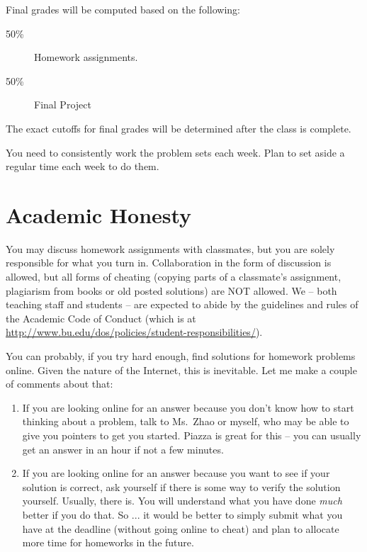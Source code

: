 \documentclass[11pt]{article}
\begin{document}
Final grades will be computed based on the following:
\begin{description}
\item[50\%] Homework assignments.  
\item[50\%] Final Project
\end{description}


The exact cutoffs for final grades will be determined after the class is
complete.

You need to consistently work the problem sets each week.   Plan
  to set aside a regular time each week to do them.

\newpage

\section*{Academic Honesty}

You may discuss homework assignments with classmates, but you are 
solely responsible for what you turn in. Collaboration in the form of
discussion is allowed, but all forms of cheating (copying parts of a
classmate's assignment, plagiarism from books or old posted solutions)
are NOT allowed. We -- both teaching staff and students -- are expected
to abide by the guidelines and rules of the Academic Code of Conduct
(which is at
\url{http://www.bu.edu/dos/policies/student-responsibilities/}).

You can probably, if you try hard enough, find solutions for homework
problems online.    Given the nature of the Internet, this is
inevitable.   Let me make a couple of comments about that:
\begin{enumerate}
\item If you are looking online for an answer because you don't know how
  to start thinking about a problem, talk to Ms.\ Zhao or myself, who may be
  able to give you pointers to get you started.  Piazza is great for
  this -- you can usually get an answer in an hour if not a few minutes.
\item If you are looking online for an answer because you want to see if
  your solution is correct, ask yourself if there is some way to verify
  the solution yourself.   Usually, there is.  You will understand what you have done
  \emph{much} better if you do that.
So ... it would be better to simply submit what you have at the deadline
(without going online to cheat) and plan to allocate more time for
homeworks in the future.
\end{enumerate}
\end{document}
